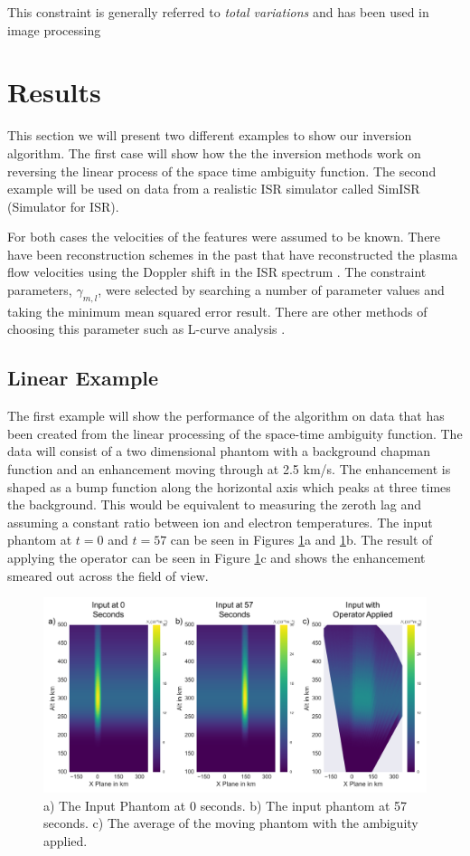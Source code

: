 \noindent This constraint is generally referred to \textit{total variations} and has been used in image processing \citep{Rudin:1992kn}

\section{Results}
\label{sec:results}
This section we will present two different examples to show our inversion algorithm. The first case will show how the the inversion methods work on reversing the linear process of the space time ambiguity function. The second example will be used on data from a realistic ISR simulator called SimISR (Simulator for ISR).

For both cases the velocities of the features were assumed to be known. There have been reconstruction schemes in the past that have reconstructed the plasma flow velocities using the Doppler shift in the ISR spectrum \citep{butler:imagingfregiondrifts}. The constraint parameters, $\gamma_{m,l}$, were selected by searching a number of parameter values and taking the minimum mean squared error result. There are other methods of choosing this parameter such as L-curve analysis \citep{Karl:2005jy}. 

\subsection{Linear Example}

The first example will show the performance of the algorithm on data that has been created from the linear processing of the space-time ambiguity function. The data will consist of a two dimensional phantom with a background chapman function and an enhancement moving through at 2.5 km/s. The enhancement is shaped as a bump function along the horizontal axis which peaks at three times the background. This would be equivalent to measuring the zeroth lag and assuming a constant ratio between ion and electron temperatures. The input phantom at $t=0$ and $t=57$ can be seen in Figures \ref{fig:simpinputfast}a and \ref{fig:simpinputfast}b. The result of applying the operator can be seen in Figure \ref{fig:simpinputfast}c and shows the enhancement smeared out across the field of view.

\begin{figure}[!ht]
\centering
\includegraphics[width=6in]{Simpleinputfast}
\caption{a) The Input Phantom at 0 seconds. b) The input phantom at 57 seconds. c) The average of the moving phantom with the ambiguity applied.}
\label{fig:simpinputfast}
\end{figure}

